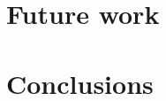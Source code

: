\documentclass{nime-alternate}
\begin{document}
\section{Future work}

\section{Conclusions}




%
%
\end{document}
